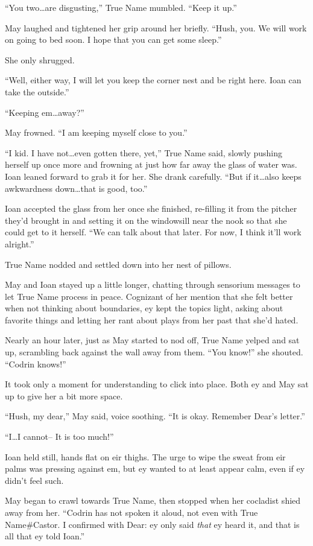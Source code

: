 ``You two\ldots are disgusting,'' True Name mumbled. ``Keep it up.''

May laughed and tightened her grip around her briefly. ``Hush, you. We will work on going to bed soon. I hope that you can get some sleep.''

She only shrugged.

``Well, either way, I will let you keep the corner nest and be right here. Ioan can take the outside.''

``Keeping em\ldots away?''

May frowned. ``I am keeping myself close to you.''

``I kid. I have not\ldots even gotten there, yet,'' True Name said, slowly pushing herself up once more and frowning at just how far away the glass of water was. Ioan leaned forward to grab it for her. She drank carefully. ``But if it\ldots also keeps awkwardness down\ldots that is good, too.''

Ioan accepted the glass from her once she finished, re-filling it from the pitcher they'd brought in and setting it on the windowsill near the nook so that she could get to it herself. ``We can talk about that later. For now, I think it'll work alright.''

True Name nodded and settled down into her nest of pillows.

May and Ioan stayed up a little longer, chatting through sensorium messages to let True Name process in peace. Cognizant of her mention that she felt better when not thinking about boundaries, ey kept the topics light, asking about favorite things and letting her rant about plays from her past that she'd hated.

Nearly an hour later, just as May started to nod off, True Name yelped and sat up, scrambling back against the wall away from them. ``You know!'' she shouted. ``Codrin knows!''

It took only a moment for understanding to click into place. Both ey and May sat up to give her a bit more space.

``Hush, my dear,'' May said, voice soothing. ``It is okay. Remember Dear's letter.''

``I\ldots I cannot-- It is too much!''

Ioan held still, hands flat on eir thighs. The urge to wipe the sweat from eir palms was pressing against em, but ey wanted to at least appear calm, even if ey didn't feel such.

May began to crawl towards True Name, then stopped when her cocladist shied away from her. ``Codrin has not spoken it aloud, not even with True Name\#Castor. I confirmed with Dear: ey only said \emph{that} ey heard it, and that is all that ey told Ioan.''

